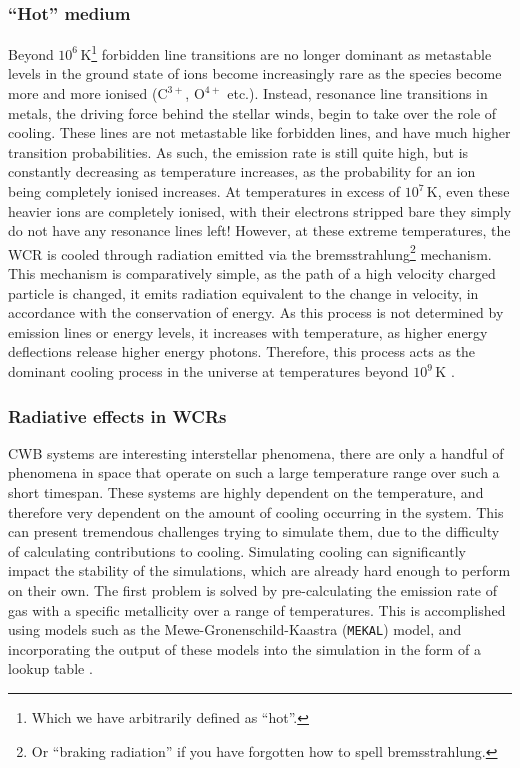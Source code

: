 \subsubsection{``Hot'' medium}

Beyond $10^6\,\si{\kelvin}$\footnote{Which we have arbitrarily defined as ``hot''.} forbidden line transitions are no longer dominant as metastable levels in the ground state of ions become increasingly rare as the species become more and more ionised ($\text{C}^{3+}$, $\text{O}^{4+}$ etc.).
Instead, resonance line transitions in metals, the driving force behind the stellar winds, begin to take over the role of cooling.
These lines are not metastable like forbidden lines, and have much higher transition probabilities.
As such, the emission rate is still quite high, but is constantly decreasing as temperature increases, as the probability for an ion being completely ionised increases.
At temperatures in excess of $10^7\,\si{\kelvin}$, even these heavier ions are completely ionised, with their electrons stripped bare they simply do not have any resonance lines left!
However, at these extreme temperatures, the WCR is cooled through radiation emitted via the bremsstrahlung\footnote{Or ``braking radiation'' if you have forgotten how to spell bremsstrahlung.} mechanism.
This mechanism is comparatively simple, as the path of a high velocity charged particle is changed, it emits radiation equivalent to the change in velocity, in accordance with the conservation of energy.
As this process is not determined by emission lines or energy levels, it increases with temperature, as higher energy deflections release higher energy photons.
Therefore, this process acts as the dominant cooling process in the universe at temperatures beyond $10^9 \, \si{\kelvin}$
\parencite[Ch.~6]{longairHighEnergyAstrophysics2011}.

\subsubsection{Radiative effects in WCRs}

CWB systems are interesting interstellar phenomena, there are only a handful of phenomena in space that operate on such a large temperature range over such a short timespan.
These systems are highly dependent on the temperature, and therefore very dependent on the amount of cooling occurring in the system.
This can present tremendous challenges trying to simulate them, due to the difficulty of calculating contributions to cooling.
Simulating cooling can significantly impact the stability of the simulations, which are already hard enough to perform on their own.
The first problem is solved by pre-calculating the emission rate of gas with a specific metallicity over a range of temperatures.
This is accomplished using models such as the Mewe-Gronenschild-Kaastra (\texttt{MEKAL}) model, and incorporating the output of these models into the simulation in the form of a lookup table
\parencite{meweCalculatedXradiationOptically1985,kaastraSPEXHighresolutionCosmic2013}.

